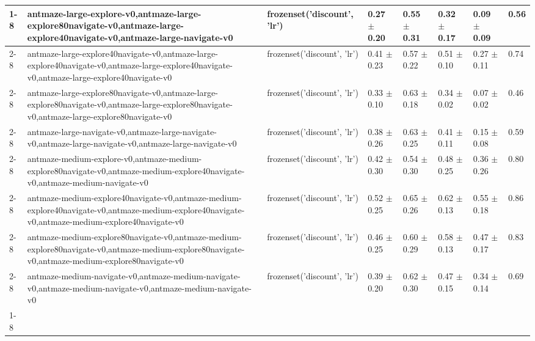 \begin{tabular}{llllllll}
\cline{1-8} \cline{2-8}
\multirow[t]{8}{*}{QRL} & antmaze-large-explore-v0,antmaze-large-explore80navigate-v0,antmaze-large-explore40navigate-v0,antmaze-large-navigate-v0 & frozenset({'discount', 'lr'}) & 0.27 $\pm$ 0.20 & 0.55 $\pm$ 0.31 & 0.32 $\pm$ 0.17 & 0.09 $\pm$ 0.09 & 0.56 \\
\cline{2-8}
 & antmaze-large-explore40navigate-v0,antmaze-large-explore40navigate-v0,antmaze-large-explore40navigate-v0,antmaze-large-explore40navigate-v0 & frozenset({'discount', 'lr'}) & 0.41 $\pm$ 0.23 & 0.57 $\pm$ 0.22 & 0.51 $\pm$ 0.10 & 0.27 $\pm$ 0.11 & 0.74 \\
\cline{2-8}
 & antmaze-large-explore80navigate-v0,antmaze-large-explore80navigate-v0,antmaze-large-explore80navigate-v0,antmaze-large-explore80navigate-v0 & frozenset({'discount', 'lr'}) & 0.33 $\pm$ 0.10 & 0.63 $\pm$ 0.18 & 0.34 $\pm$ 0.02 & 0.07 $\pm$ 0.02 & 0.46 \\
\cline{2-8}
 & antmaze-large-navigate-v0,antmaze-large-navigate-v0,antmaze-large-navigate-v0,antmaze-large-navigate-v0 & frozenset({'discount', 'lr'}) & 0.38 $\pm$ 0.26 & 0.63 $\pm$ 0.25 & 0.41 $\pm$ 0.11 & 0.15 $\pm$ 0.08 & 0.59 \\
\cline{2-8}
 & antmaze-medium-explore-v0,antmaze-medium-explore80navigate-v0,antmaze-medium-explore40navigate-v0,antmaze-medium-navigate-v0 & frozenset({'discount', 'lr'}) & 0.42 $\pm$ 0.30 & 0.54 $\pm$ 0.30 & 0.48 $\pm$ 0.25 & 0.36 $\pm$ 0.26 & 0.80 \\
\cline{2-8}
 & antmaze-medium-explore40navigate-v0,antmaze-medium-explore40navigate-v0,antmaze-medium-explore40navigate-v0,antmaze-medium-explore40navigate-v0 & frozenset({'discount', 'lr'}) & 0.52 $\pm$ 0.25 & 0.65 $\pm$ 0.26 & 0.62 $\pm$ 0.13 & 0.55 $\pm$ 0.18 & 0.86 \\
\cline{2-8}
 & antmaze-medium-explore80navigate-v0,antmaze-medium-explore80navigate-v0,antmaze-medium-explore80navigate-v0,antmaze-medium-explore80navigate-v0 & frozenset({'discount', 'lr'}) & 0.46 $\pm$ 0.25 & 0.60 $\pm$ 0.29 & 0.58 $\pm$ 0.13 & 0.47 $\pm$ 0.17 & 0.83 \\
\cline{2-8}
 & antmaze-medium-navigate-v0,antmaze-medium-navigate-v0,antmaze-medium-navigate-v0,antmaze-medium-navigate-v0 & frozenset({'discount', 'lr'}) & 0.39 $\pm$ 0.20 & 0.62 $\pm$ 0.30 & 0.47 $\pm$ 0.15 & 0.34 $\pm$ 0.14 & 0.69 \\
\cline{1-8} \cline{2-8}
\bottomrule
\end{tabular}
